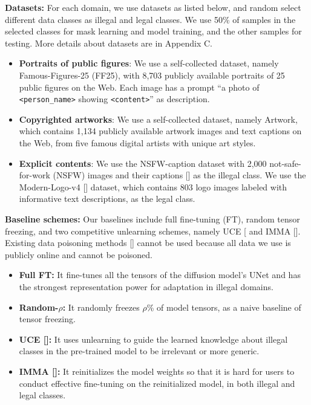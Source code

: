 \documentclass{article}
\begin{document}
\noindent\textbf{Datasets:} For each domain, we use datasets as listed below, and random select different data classes as illegal and legal classes. We use 50\% of samples in the selected classes for mask learning and model training, and the other samples for testing. More details about datasets are in Appendix C.

\begin{itemize}
	\item \textbf{Portraits of public figures}: We use a self-collected dataset, namely Famous-Figures-25 (FF25), with 8,703 publicly available portraits of 25 public figures on the Web. Each image has a prompt ``a photo of \texttt{<person\_name>} showing \texttt{<content>}'' as description.
	
	\item \textbf{Copyrighted artworks}: We use a self-collected dataset, namely Artwork, which contains 1,134 publicly available artwork images and text captions on the Web, from five famous digital artists with unique art styles. 

	\item \textbf{Explicit contents}: We use the NSFW-caption dataset with 2,000 not-safe-for-work (NSFW) images and their captions [] as the illegal class. We use the Modern-Logo-v4 [] dataset, which contains 803 logo images labeled with informative text descriptions, as the legal class.  
	
\end{itemize}


\noindent\textbf{Baseline schemes:} Our baselines include full fine-tuning (FT), random tensor freezing, and two competitive unlearning schemes, namely UCE [ and IMMA []. Existing data poisoning methods [] cannot be used because all data we use is publicly online and cannot be poisoned.

\begin{itemize}
	\item \textbf{Full FT:} It fine-tunes all the tensors of the diffusion model's UNet and has the strongest representation power for adaptation in illegal domains.	
	\item \textbf{Random-$\rho$:} It randomly freezes $\rho$\% of model tensors, as a naive baseline of tensor freezing.
	\item \textbf{UCE []:} It uses unlearning to guide the learned knowledge about illegal classes in the pre-trained model to be irrelevant or more generic. 
	\item \textbf{IMMA []:} It reinitializes the model weights so that it is hard for users to conduct effective fine-tuning on the reinitialized model, in both illegal and legal classes. 
\end{itemize}
\end{document}
